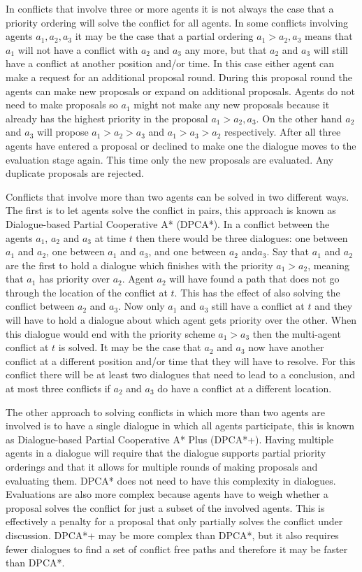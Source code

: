 In conflicts that involve three or more agents it is not always the case that a
priority ordering will solve the conflict for all agents. In some conflicts
involving agents $a_1, a_2, a_3$ it may be the case that a partial ordering
$a_1 > a_2, a_3$ means that $a_1$ will not have a conflict with $a_2$ and $a_3$
any more, but that $a_2$ and $a_3$ will still have a conflict at another
position and/or time. In this case either agent can make a request for an
additional proposal round. During this proposal round the agents can make new
proposals or expand on additional proposals. Agents do not need to make
proposals so $a_1$ might not make any new proposals because it already has the
highest priority in the proposal $a_1 > a_2, a_3$. On the other hand $a_2$ and
$a_3$ will propose $a_1 > a_2 > a_3$ and $a_1 > a_3 > a_2$ respectively. After 
all three agents have entered a
proposal or declined to make one the dialogue moves to the evaluation stage
again. This time only the new proposals are evaluated. Any duplicate proposals 
are rejected.

Conflicts that involve more than two agents can be solved in two different
ways. The first is to let agents solve the conflict in pairs, this approach is
known as Dialogue-based Partial Cooperative A* (DPCA*). In a conflict between
the agents $a_1$, $a_2$ and $a_3$ at time $t$ then there would be three
dialogues: one between $a_1$ and $a_2$, one between $a_1$ and $a_3$, and one
between $a_2$ and$a_3$. Say that $a_1$ and $a_2$ are the first to hold a
dialogue which finishes with the priority $a_1 > a_2$, meaning that $a_1$ has
priority over $a_2$. Agent $a_2$ will have found a path that does not go
through the location of the conflict at $t$. This has the effect of also
solving the conflict between $a_2$ and $a_3$. Now only $a_1$ and $a_3$ still
have a conflict at $t$ and they will have to hold a dialogue about which agent
gets priority over the other. When this dialogue would end with the priority
scheme $a_1 > a_3$ then the multi-agent conflict at $t$ is solved. It may be
the case that $a_2$ and $a_3$ now have another conflict at a different position
and/or time that they will have to resolve. For this conflict there will be at
least two dialogues that need to lead to a conclusion, and at most three
conflicts if $a_2$ and $a_3$ do have a conflict at a different location.

The other approach to solving conflicts in which more than two agents are 
involved is to have a single dialogue in which all agents
participate, this is known as Dialogue-based Partial Cooperative A* Plus
(DPCA*+). Having multiple agents in a dialogue will require that the dialogue
supports partial priority orderings and that it allows for multiple rounds of
making proposals and evaluating them. DPCA* does not need to have this
complexity in dialogues. Evaluations are also more complex because agents have 
to weigh whether a proposal solves the conflict for just a subset of the 
involved agents. This is effectively a penalty for a proposal that only 
partially solves the conflict under discussion.
DPCA*+ may be more complex than DPCA*, but it also
requires fewer dialogues to find a set of conflict free paths and therefore it
may be faster than DPCA*.

